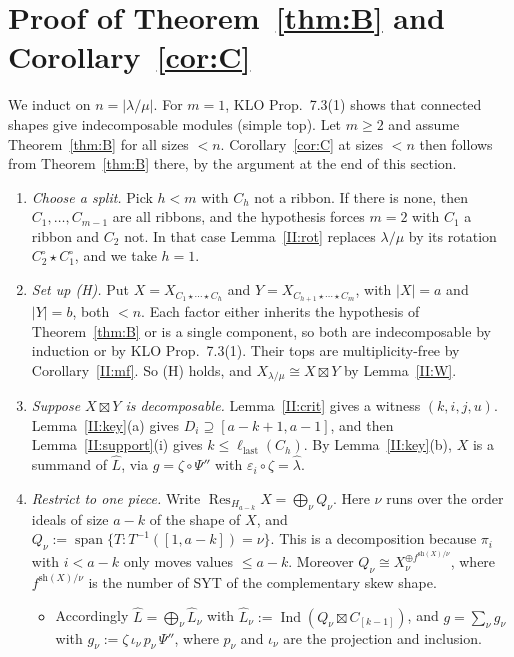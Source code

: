 \documentclass[11pt]{amsart}
\newcommand{\Ind}{\operatorname{Ind}}
\newcommand{\Res}{\operatorname{Res}}
\newcommand{\sq}{\boxtimes}
\theoremstyle{plain}
\theoremstyle{definition}
\begin{document}
\section{Proof of Theorem~\ref{thm:B} and Corollary~\ref{cor:C}}

We induct on $n=|\lambda/\mu|$. For $m=1$, KLO Prop.~7.3(1) shows that connected shapes give indecomposable modules (simple top). Let $m\ge2$ and assume Theorem~\ref{thm:B} for all sizes $<n$. Corollary~\ref{cor:C} at sizes $<n$ then follows from Theorem~\ref{thm:B} there, by the argument at the end of this section.

\begin{enumerate}[label=\textup{Step \arabic*.},leftmargin=3.6em,itemsep=3pt]
\item \emph{Choose a split.} Pick $h<m$ with $C_h$ not a ribbon. If there is none, then $C_1,\dots,C_{m-1}$ are all ribbons, and the hypothesis forces $m=2$ with $C_1$ a ribbon and $C_2$ not. In that case Lemma~\ref{II:rot} replaces $\lambda/\mu$ by its rotation $C_2^\circ\star C_1^\circ$, and we take $h=1$.
\item \emph{Set up (H).} Put $X=X_{C_1\star\cdots\star C_h}$ and $Y=X_{C_{h+1}\star\cdots\star C_m}$, with $|X|=a$ and $|Y|=b$, both $<n$. Each factor either inherits the hypothesis of Theorem~\ref{thm:B} or is a single component, so both are indecomposable by induction or by KLO Prop.~7.3(1). Their tops are multiplicity-free by Corollary~\ref{II:mf}. So (H) holds, and $X_{\lambda/\mu}\cong X\sq Y$ by Lemma~\ref{II:W}.
\item \emph{Suppose $X\sq Y$ is decomposable.} Lemma~\ref{II:crit} gives a witness $(k,i,j,u)$. Lemma~\ref{II:key}(a) gives $D_i\supseteq[a-k+1,a-1]$, and then Lemma~\ref{II:support}(i) gives $k\le\ell_{\mathrm{last}}(C_h)$. By Lemma~\ref{II:key}(b), $X$ is a summand of $\widehat L$, via $g=\zeta\circ\Psi''$ with $\varepsilon_i\circ\zeta=\widehat\lambda$.
\item \emph{Restrict to one piece.} Write $\Res_{H_{a-k}}X=\bigoplus_\nu Q_\nu$. Here $\nu$ runs over the order ideals of size $a-k$ of the shape of $X$, and $Q_\nu:=\operatorname{span}\{T:T^{-1}([1,a-k])=\nu\}$. This is a decomposition because $\pi_i$ with $i<a-k$ only moves values $\le a-k$. Moreover $Q_\nu\cong X_\nu^{\oplus f^{\mathrm{sh}(X)/\nu}}$, where $f^{\mathrm{sh}(X)/\nu}$ is the number of SYT of the complementary skew shape.
\begin{itemize}[itemsep=1pt]
\item Accordingly $\widehat L=\bigoplus_\nu\widehat L_\nu$ with $\widehat L_\nu:=\Ind(Q_\nu\sq C_{[k-1]})$, and $g=\sum_\nu g_\nu$ with $g_\nu:=\zeta\,\iota_\nu\,p_\nu\,\Psi''$, where $p_\nu$ and $\iota_\nu$ are the projection and inclusion.

\end{itemize}
\end{enumerate}
\end{document}
